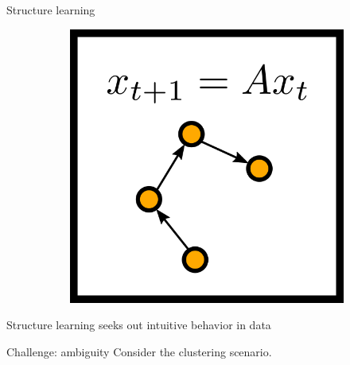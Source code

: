 \documentclass[10pt, compress]{beamer}
\begin{document}
\begin{frame}{Structure learning}
\begin{figure}
\begin{subfigure}[t]{0.27\textwidth}
    \end{subfigure}
    \pause
    \hfill
    \begin{subfigure}[t]{0.27\textwidth}
        \centering
        \includegraphics[width=\textwidth]{img/lds}
    \end{subfigure}
  \end{figure}
  \pause
  Structure learning seeks out intuitive behavior in data

\end{frame}

\begin{frame}{Challenge: ambiguity}
  \centering
  Consider the clustering scenario.



\end{frame}
\end{document}
